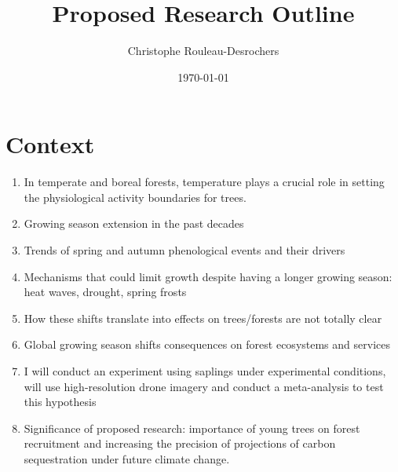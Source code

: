 \documentclass{article}
\title{Proposed Research Outline}
\date{\today}
\author{Christophe Rouleau-Desrochers}
\begin{document}

\maketitle



\section{Context}
\begin {enumerate}
	\item In temperate and boreal forests, temperature plays a crucial role in setting the physiological activity boundaries for trees.
	\item Growing season extension in the past decades
	\item Trends of spring and autumn phenological events and their drivers %
	\item Mechanisms that could limit growth despite having a longer growing season: heat waves, drought, spring frosts
	\item How these shifts translate into effects on trees/forests are not totally clear
	\item Global growing season shifts consequences on forest ecosystems and services
	\item I will conduct an experiment using saplings under experimental conditions, will use high-resolution drone imagery and conduct a meta-analysis to test this hypothesis
	\item Significance of proposed research: importance of young trees on forest recruitment and increasing the precision of projections of carbon sequestration under future climate change. 
\end {enumerate}
\end{document}

